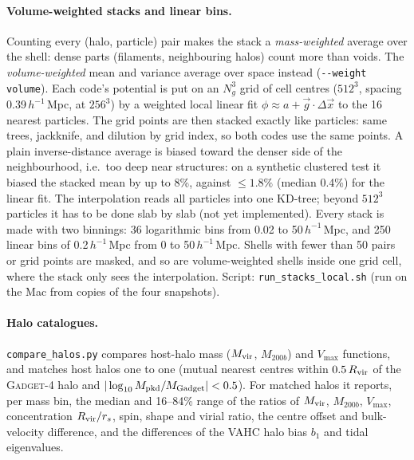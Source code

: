 \documentclass[11pt,a4paper]{article}
\newcommand{\gad}{\textsc{Gadget-4}}
\newcommand{\fp}[1]{\nolinkurl{#1}}
\newcommand{\Mpch}{$h^{-1}$\,Mpc}
\begin{document}
\paragraph{Volume-weighted stacks and linear bins.} Counting every (halo, particle) pair makes the stack a
\emph{mass-weighted} average over the shell: dense parts (filaments, neighbouring halos) count more than voids. The
\emph{volume-weighted} mean and variance average over space instead (\texttt{-{}-weight volume}). Each code's potential
is put on an $N_g^3$ grid of cell centres ($512^3$, spacing 0.39\,\Mpch, at $256^3$) by a weighted local linear
fit $\phi \approx a + \vec g\cdot\Delta\vec x$ to the 16 nearest particles. The grid points are then stacked exactly
like particles: same trees, jackknife, and dilution by grid index, so both codes use the same points. A plain
inverse-distance average is biased toward the denser side of the neighbourhood, i.e.\ too deep near structures: on a
synthetic clustered test it biased the stacked mean by up to 8\%, against $\le 1.8\%$ (median 0.4\%) for the linear
fit. The interpolation reads all particles into one KD-tree; beyond $512^3$ particles it has to be done slab by slab
(not yet implemented). Every stack is made with two binnings: 36 logarithmic bins from 0.02 to 50\,\Mpch, and 250
linear bins of 0.2\,\Mpch{} from 0 to 50\,\Mpch. Shells with fewer than 50 pairs or grid points are masked, and so are volume-weighted shells inside one grid
cell, where the stack only sees the interpolation. Script:
\fp{run_stacks_local.sh} (run on the Mac from copies of the four snapshots).

\paragraph{Halo catalogues.} \fp{compare_halos.py} compares host-halo mass ($M_{\rm vir}$, $M_{200b}$) and
$V_{\max}$ functions, and matches host halos one to one (mutual nearest centres within $0.5\,R_{\rm vir}$ of the
\gad{} halo and $|\log_{10} M_{\rm pkd}/M_{\rm Gadget}| < 0.5$). For matched halos it reports, per mass bin, the
median and 16--84\% range of the ratios of $M_{\rm vir}$, $M_{200b}$, $V_{\max}$, concentration $R_{\rm vir}/r_s$,
spin, shape and virial ratio, the centre offset and bulk-velocity difference, and the differences of the VAHC
halo bias $b_1$ and tidal eigenvalues.
\end{document}
